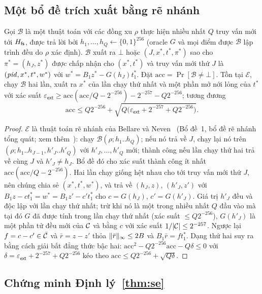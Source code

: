 \subsection{Một bổ đề trích xuất bằng rẽ nhánh}

\begin{lemma}
\label{lem:fork}
Gọi $\mathcal B$ là một thuật toán với các đồng xu $\rho$ thực hiện nhiều nhất
$Q$ truy vấn mới tới $H_{\mathsf{fs}}$, được trả lời bởi $h_1,\dots,h_Q\leftarrow\{0,1\}^{256}$
(oracle $G$ và mọi điểm được $\mathcal B$ lập trình đều do $\rho$ xác định).
$\mathcal B$ xuất ra $\bot$ hoặc $(J,x^*,t^*,\pi^*)$ sao cho
$\pi^*=(h_J,z^*)$ được chấp nhận cho $(x^*,t^*)$ và truy vấn mới thứ $J$ là
$(\mathit{pid},x^*,t^*,w^*)$ với $w^*=B_1z^*-G(h_J)t_1^*$. Đặt
$\mathrm{acc}=\Pr[\mathcal B\neq\bot]$. Tồn tại $\mathcal E$, chạy
$\mathcal B$ hai lần, xuất ra $x^*$ của lần chạy thứ nhất và một phần mở nới
lỏng của $t^*$ với xác suất $\varepsilon_{\mathsf{ext}}\ge\mathrm{acc}(\mathrm{acc}/Q-2^{-256})
-2^{-257}-Q2^{-256}$; tương đương
\[
\mathrm{acc}\le Q2^{-256}+\sqrt{Q\bigl(\varepsilon_{\mathsf{ext}}+2^{-257}+Q2^{-256}\bigr)}.
\]
\end{lemma}
\begin{proof}
$\mathcal E$ là thuật toán rẽ nhánh của Bellare và Neven~\cite{ref:bn06}
(Bổ đề~1, bổ đề rẽ nhánh tổng quát; xem thêm~\cite{ref:ps00}): chạy
$\mathcal B(\rho;h_1..h_Q)$; nếu nó trả về $J$, chạy lại nó trên
$(\rho;h_1..h_{J-1},h'_J..h'_Q)$ với $h'_J,\dots,h'_Q$ mới; thành công nếu lần
chạy thứ hai trả về cùng $J$ và $h'_J\neq h_J$. Bổ đề đó cho xác suất thành công
ít nhất $\mathrm{acc}(\mathrm{acc}/Q-2^{-256})$. Hai lần chạy giống hệt nhau cho
tới truy vấn mới thứ $J$, nên chúng chia sẻ $(x^*,t^*,w^*)$, và trả về $(h_J,z)$,
$(h'_J,z')$ với $B_1z-ct_1^*=w^*=B_1z'-c't_1^*$ cho $c=G(h_J)$, $c'=G(h'_J)$.
Giá trị $h'_J$ đều và độc lập với lần chạy thứ nhất; trừ khi nó là một trong
nhiều nhất $Q$ đầu vào mà tại đó $G$ đã được tính trong lần chạy thứ nhất
(xác suất $\le Q2^{-256}$), $G(h'_J)$ là một phần tử đều mới của $\mathcal{C}$ và
bằng $c$ với xác suất $1/|\mathcal{C}|\le2^{-257}$. Ngược lại
$f=c-c'\in\bar{\mathcal{C}}$ và $\bar r=z-z'$ thỏa $\lVert \bar r \rVert_\infty\le2B$ và
$B_1\bar r=ft_1^*$. Dạng thứ hai suy ra bằng cách giải bất đẳng thức bậc hai:
$\mathrm{acc}^2-Q2^{-256}\mathrm{acc}-Q\delta\le0$ với
$\delta=\varepsilon_{\mathsf{ext}}+2^{-257}+Q2^{-256}$ kéo theo
$\mathrm{acc}\le Q2^{-256}+\sqrt{Q\delta}$.
\end{proof}

\subsection{Chứng minh Định lý~\ref{thm:se}}

